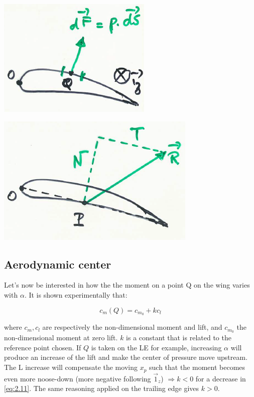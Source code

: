					\begin{center}
					\begin{minipage}{0.4\textwidth}
					\includegraphics[scale=0.65]{ch2/12}
					\label{fig:2.11}
					\end{minipage}
					\begin{minipage}{0.4\textwidth}
					\includegraphics[scale=0.6]{ch2/13}
					\label{fig:2.12}
					\end{minipage}
					\end{center}
					
		\subsection{Aerodynamic center}
			Let's now be interested in how the the moment on a point Q on the wing varies with $\alpha$. It is shown experimentally that:
			
			\begin{equation}
			c_m(Q) = c_{m_0} + k c_l
			\label{eq:2.11}
			\end{equation}
			
			where $c_m, c_l$ are respectively the non-dimensional moment and lift, and $c_{m_0}$ the non-dimensional moment at zero lift. $k$ is a constant that is related to the reference point chosen. If $Q$ is taken on the LE for example, increasing $\alpha$ will produce an increase of the lift and make the center of pressure move upstream. The L increase will compensate the moving $x_p$ such that the moment becomes even more noose-down (more negative following $\vec{1}_z$) $\Rightarrow k<0$ for a decrease in \eqref{eq:2.11}. The same reasoning applied on the trailing edge gives $k>0$. \\
			
